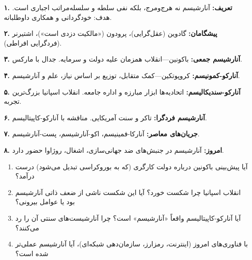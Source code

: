 \begin{summarybox}

\textbf{۱. تعریف:} آنارشیسم نه هرج‌ومرج، بلکه نفی سلطه و سلسله‌مراتب اجباری است. هدف: خودگردانی و همکاری داوطلبانه.

\textbf{۲. پیشگامان:} گادوین (عقل‌گرایی)، پرودون («مالکیت دزدی است»)، اشتیرنر (فردگرایی افراطی).

\textbf{۳. آنارشیسم جمعی:} باکونین—انقلاب همزمان علیه دولت و سرمایه. جدال با مارکس.

\textbf{۴. آنارکو-کمونیسم:} کروپوتکین—کمک متقابل، توزیع بر اساس نیاز، علم و آنارشیسم.

\textbf{۵. آنارکو-سندیکالیسم:} اتحادیه‌ها ابزار مبارزه و اداره جامعه. انقلاب اسپانیا بزرگ‌ترین تجربه.

\textbf{۶. آنارشیسم فردگرا:} تاکر و سنت آمریکایی. مناقشه با آنارکو-کاپیتالیسم.

\textbf{۷. جریان‌های معاصر:} آنارکا-فمینیسم، اکو-آنارشیسم، پست-آنارشیسم.

\textbf{۸. امروز:} آنارشیسم در جنبش‌های ضد جهانی‌سازی، اشغال، روژاوا حضور دارد.

\end{summarybox}

\vspace{20pt}

\begin{questionbox}

\begin{enumerate}[nosep, rightmargin=1cm]
    \item آیا پیش‌بینی باکونین درباره دولت کارگری (که به بوروکراسی تبدیل می‌شود) درست درآمد؟

    \item انقلاب اسپانیا چرا شکست خورد؟ آیا این شکست ناشی از ضعف ذاتی آنارشیسم بود یا عوامل بیرونی؟

    \item آیا آنارکو-کاپیتالیسم واقعاً «آنارشیسم» است؟ چرا آنارشیست‌های سنتی آن را رد می‌کنند؟

    \item با فناوری‌های امروز (اینترنت، رمزارز، سازمان‌دهی شبکه‌ای)، آیا آنارشیسم عملی‌تر شده است؟
\end{enumerate}

\end{questionbox}

